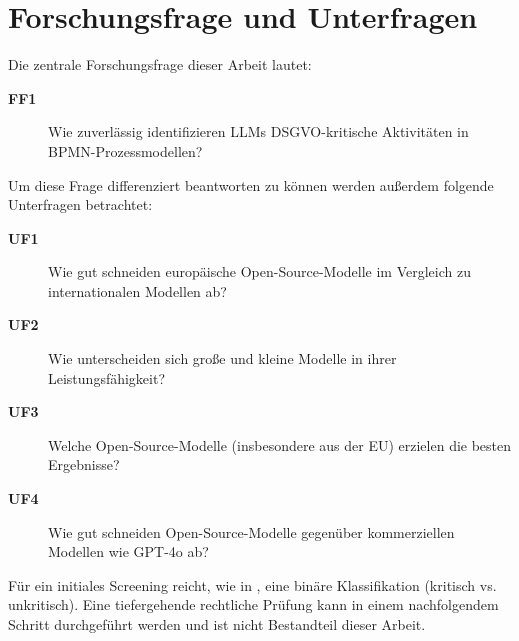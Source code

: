 \section{Forschungsfrage und Unterfragen}\label{sec:forschungsfrage-und-unterfragen}

Die zentrale Forschungsfrage dieser Arbeit lautet:

\begin{description}
    \item[\textbf{FF1}] Wie zuverlässig identifizieren \acp{LLM} \ac{DSGVO}-kritische Aktivitäten in \ac{BPMN}-Prozessmodellen?
\end{description}

Um diese Frage differenziert beantworten zu können werden außerdem folgende Unterfragen betrachtet:

\begin{description}
    \item[\textbf{UF1}] Wie gut schneiden europäische Open-Source-Modelle im Vergleich zu internationalen Modellen ab?
    \item[\textbf{UF2}] Wie unterscheiden sich große und kleine Modelle in ihrer Leistungsfähigkeit?
    \item[\textbf{UF3}] Welche Open-Source-Modelle (insbesondere aus der EU) erzielen die besten Ergebnisse?
    \item[\textbf{UF4}] Wie gut schneiden Open-Source-Modelle gegenüber kommerziellen Modellen wie GPT-4o ab?
\end{description}

Für ein initiales Screening reicht, wie in \cite{nake2023towards}, eine binäre Klassifikation (kritisch vs. unkritisch). Eine tiefergehende rechtliche Prüfung kann in einem nachfolgendem Schritt durchgeführt werden und ist nicht Bestandteil dieser Arbeit.